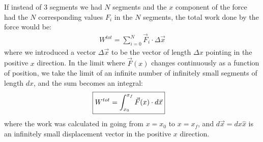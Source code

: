 If instead of 3 segments we had $N$ segments and the $x$ component of the force had the $N$ corresponding values $F_i$ in the $N$ segments, the total work done by the force would be:
\begin{align*}
W^{tot} = \sum_{i=0}^N\vec F_i \cdot \Delta \vec x
\end{align*}
where we introduced a vector $\Delta \vec x$ to be the vector of length $\Delta x$ pointing in the positive $x$ direction. In the limit where $\vec F(x)$ changes continuously as a function of position, we take the limit of an infinite number of infinitely small segments of length $dx$, and the sum becomes an integral:
\begin{align}
\Aboxed{W^{tot} = \int_{x_0}^{x_f}\vec F(x) \cdot d\vec x}
\end{align}
where the work was calculated in going from $x=x_0$ to $x=x_f$, and $d\vec x=dx\hat x$ is an infinitely small displacement vector in the positive $x$ direction.

